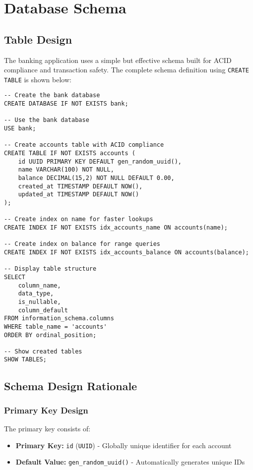 \section{Database Schema}

\subsection{Table Design}
The banking application uses a simple but effective schema built for ACID compliance and transaction safety. The complete schema definition using \texttt{CREATE TABLE} is shown below:

\begin{verbatim}
-- Create the bank database
CREATE DATABASE IF NOT EXISTS bank;

-- Use the bank database
USE bank;

-- Create accounts table with ACID compliance
CREATE TABLE IF NOT EXISTS accounts (
    id UUID PRIMARY KEY DEFAULT gen_random_uuid(),
    name VARCHAR(100) NOT NULL,
    balance DECIMAL(15,2) NOT NULL DEFAULT 0.00,
    created_at TIMESTAMP DEFAULT NOW(),
    updated_at TIMESTAMP DEFAULT NOW()
);

-- Create index on name for faster lookups
CREATE INDEX IF NOT EXISTS idx_accounts_name ON accounts(name);

-- Create index on balance for range queries
CREATE INDEX IF NOT EXISTS idx_accounts_balance ON accounts(balance);

-- Display table structure
SELECT
    column_name,
    data_type,
    is_nullable,
    column_default
FROM information_schema.columns
WHERE table_name = 'accounts'
ORDER BY ordinal_position;

-- Show created tables
SHOW TABLES;
\end{verbatim}

\subsection{Schema Design Rationale}

\subsubsection{Primary Key Design}
The primary key consists of:
\begin{itemize}
    \item \textbf{Primary Key:} \texttt{id} (\texttt{UUID}) - Globally unique identifier for each account
    \item \textbf{Default Value:} \texttt{gen\_random\_uuid()} - Automatically generates unique IDs
\end{itemize}

